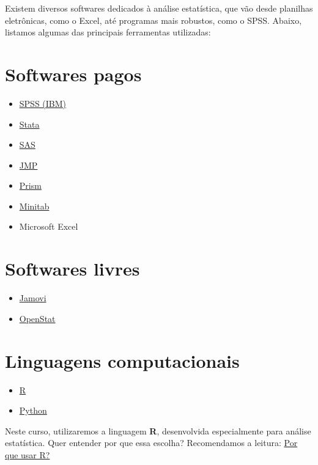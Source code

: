 \documentclass[
]{book}
\providecommand{\tightlist}{%
  \setlength{\itemsep}{0pt}\setlength{\parskip}{0pt}}
\begin{document}
Existem diversos softwares dedicados à análise estatística, que vão desde planilhas eletrônicas, como o Excel, até programas mais robustos, como o SPSS. Abaixo, listamos algumas das principais ferramentas utilizadas:

\section{Softwares pagos}\label{softwares-pagos}

\begin{itemize}
\tightlist
\item
  \href{https://www.ibm.com/br-pt/spss}{SPSS (IBM)}
\item
  \href{https://www.stata-brasil.com/software/stata.html}{Stata}
\item
  \href{https://www.sas.com/pt_br}{SAS}
\item
  \href{https://www.jmp.com/}{JMP}
\item
  \href{https://software.com.br/p/prism}{Prism}
\item
  \href{https://osbsoftware.com.br/produto/minitab-statistical-software}{Minitab}
\item
  Microsoft Excel
\end{itemize}

\section{Softwares livres}\label{softwares-livres}

\begin{itemize}
\tightlist
\item
  \href{https://www.jamovi.org}{Jamovi}
\item
  \href{https://openstat.info}{OpenStat}
\end{itemize}

\section{Linguagens computacionais}\label{linguagens-computacionais}

\begin{itemize}
\tightlist
\item
  \href{https://www.r-project.org}{R}
\item
  \href{https://www.python.org/}{Python}
\end{itemize}

Neste curso, utilizaremos a linguagem \textbf{R}, desenvolvida especialmente para análise estatística. Quer entender por que essa escolha? Recomendamos a leitura: \href{https://blog.curso-r.com/posts/2021-07-23-por-que-usar-r/}{Por que usar R?}
\end{document}
